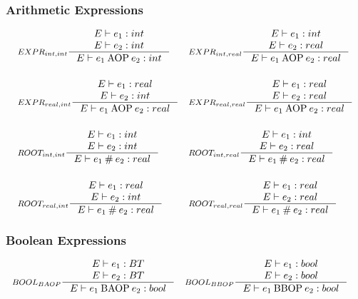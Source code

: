 \subsubsection{Arithmetic Expressions}
\begin{align*}
&\inference[$EXPR_{int,int}$]{E \vdash e_1 : int \\
                       E \vdash e_2 : int}
                    {E \vdash e_1 \mathbin{\textrm{AOP}} e_2 : int}
&
&\inference[$EXPR_{int,real}$]{E \vdash e_1 : int \\
                       E \vdash e_2 : real}
                    {E \vdash e_1 \mathbin{\textrm{AOP}} e_2 : real}
\\\\
&\inference[$EXPR_{real,int}$]{E \vdash e_1 : real \\
                       E \vdash e_2 : int}
                    {E \vdash e_1 \mathbin{\textrm{AOP}} e_2 : real}
&
&\inference[$EXPR_{real,real}$]{E \vdash e_1 : real \\
                       E \vdash e_2 : real}
                    {E \vdash e_1 \mathbin{\textrm{AOP}} e_2 : real}
\\\\  
&\inference[$ROOT_{int,int}$]{E \vdash e_1 : int \\
                       E \vdash e_2 : int}
                    {E \vdash e_1 \mathbin{\#} e_2 : real}
&
&\inference[$ROOT_{int,real}$]{E \vdash e_1 : int \\
                       E \vdash e_2 : real}
                    {E \vdash e_1 \mathbin{\#} e_2 : real}
\\\\
&\inference[$ROOT_{real,int}$]{E \vdash e_1 : real \\
                       E \vdash e_2 : int}
                    {E \vdash e_1 \mathbin{\#} e_2 : real}
&
&\inference[$ROOT_{real,real}$]{E \vdash e_1 : real \\
                       E \vdash e_2 : real}
                    {E \vdash e_1 \mathbin{\#} e_2 : real}
\end{align*}

\subsubsection{Boolean Expressions}
\begin{align*}
&\inference[$BOOL_{BAOP}$]{E \vdash e_1 : BT \\
                       E \vdash e_2 : BT}
                    {E \vdash e_1 \mathbin{\textrm{BAOP}} e_2 : bool}
&
&\inference[$BOOL_{BBOP}$]{E \vdash e_1 : bool \\
                       E \vdash e_2 : bool}
                    {E \vdash e_1 \mathbin{\textrm{BBOP}} e_2 : bool}
\end{align*}

